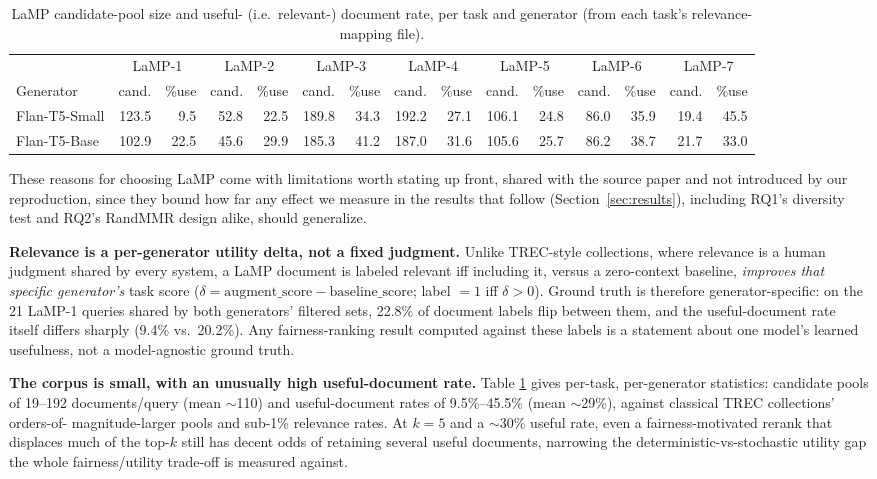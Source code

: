 \documentclass[10pt,twocolumn]{article}
\begin{document}
\begin{table}[t]
\centering
\scriptsize
\caption{LaMP candidate-pool size and useful- (i.e.\ relevant-) document rate, per task and generator (from each task's relevance-mapping file).}
\label{tab:corpus}
\begin{tabular}{@{}lrrrrrrrrrrrrrr@{}}
\toprule
& \multicolumn{2}{c}{LaMP-1} & \multicolumn{2}{c}{LaMP-2} & \multicolumn{2}{c}{LaMP-3} & \multicolumn{2}{c}{LaMP-4} & \multicolumn{2}{c}{LaMP-5} & \multicolumn{2}{c}{LaMP-6} & \multicolumn{2}{c}{LaMP-7} \\
Generator & cand. & \%use & cand. & \%use & cand. & \%use & cand. & \%use & cand. & \%use & cand. & \%use & cand. & \%use \\
\midrule
Flan-T5-Small & 123.5 & 9.5 & 52.8 & 22.5 & 189.8 & 34.3 & 192.2 & 27.1 & 106.1 & 24.8 & 86.0 & 35.9 & 19.4 & 45.5 \\
Flan-T5-Base  & 102.9 & 22.5 & 45.6 & 29.9 & 185.3 & 41.2 & 187.0 & 31.6 & 105.6 & 25.7 & 86.2 & 38.7 & 21.7 & 33.0 \\
\bottomrule
\end{tabular}
\end{table}

These reasons for choosing LaMP come with limitations worth stating up front, shared
with the source paper and not introduced by our reproduction, since they bound how
far any effect we measure in the results that follow (Section~\ref{sec:results}),
including RQ1's diversity test and RQ2's RandMMR design alike, should generalize.

\textbf{Relevance is a per-generator utility delta, not a fixed judgment.} Unlike
TREC-style collections, where relevance is a human judgment shared by every system, a
LaMP document is labeled relevant iff including it, versus a zero-context baseline,
\emph{improves that specific generator's} task score
($\delta = \text{augment\_score} - \text{baseline\_score}$; label $=1$ iff
$\delta{>}0$). Ground truth is therefore generator-specific: on the 21 LaMP-1 queries
shared by both generators' filtered sets, 22.8\% of document labels flip between
them, and the useful-document rate itself differs sharply (9.4\% vs.\ 20.2\%). Any
fairness-ranking result computed against these labels is a statement about one
model's learned usefulness, not a model-agnostic ground truth.

\textbf{The corpus is small, with an unusually high useful-document rate.} Table
\ref{tab:corpus} gives per-task, per-generator statistics: candidate pools of
19--192 documents/query (mean $\sim$110) and useful-document rates of
9.5\%--45.5\% (mean $\sim$29\%), against classical TREC collections' orders-of-
magnitude-larger pools and sub-1\% relevance rates. At $k{=}5$
\cite{eunkim2025fairrag} and a $\sim$30\% useful rate, even a fairness-motivated
rerank that displaces much of the top-$k$ still has decent odds of retaining several
useful documents, narrowing the deterministic-vs-stochastic utility gap the whole
fairness/utility trade-off is measured against.
\end{document}
